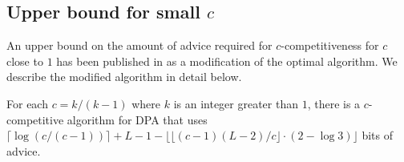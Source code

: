 \subsection{Upper bound for small $c$}

An upper bound on the amount of advice required for $c$-competitiveness
for $c$ close to $1$ has been published in \cite{sofsem2014} as a
modification of the optimal algorithm. We describe the modified algorithm
in detail below.

\begin{theorem}\label{theorem:dpa-log3}
    For each $c = k/(k-1)$ where $k$ is an integer greater than $1$, there
    is a $c$-competitive algorithm for DPA that uses
    $\lceil\log(c/(c-1))\rceil + L-1 - \lfloor\lfloor(c-1)(L-2)/c\rfloor
    \cdot (2 - \log 3)\rfloor$ bits of advice.
\end{theorem}

